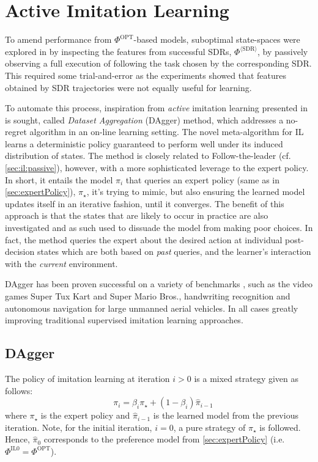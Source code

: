 \documentclass[twocolumn]{svjour3}
\begin{document}
\section{Active Imitation Learning}\label{sec:il:active}

To amend performance from $\Phi^{\text{OPT}}$-based models, suboptimal 
state-spaces were explored in \cite{InRu15a} by inspecting the features from 
successful SDRs, $\Phi^{\langle\text{SDR}\rangle}$, by passively observing a 
full execution of following the task chosen by the corresponding SDR. 
This required some trial-and-error as the experiments showed that features 
obtained by SDR trajectories were not equally useful for learning.

To automate this process, inspiration from \emph{active} imitation learning 
presented in \cite{RossGB11} is sought, called \emph{Dataset Aggregation} 
(DAgger) method, which addresses a no-regret algorithm in an on-line learning 
setting. 
The novel meta-algorithm for IL learns a deterministic policy guaranteed to 
perform well under its induced distribution of states. 
The method is closely related to Follow-the-leader (cf. 
\cref{sec:il:passive}), however, with a more sophisticated leverage to the 
expert policy. 
In short, it entails the model $\pi_i$ that queries an expert policy (same as 
in \cref{sec:expertPolicy}), $\pi_\star$, it's trying to mimic, 
but also ensuring the learned model updates itself in an iterative fashion, 
until it converges. 
The benefit of this approach is that the states that are likely to occur in 
practice are also investigated and as such used to dissuade the model from 
making poor choices. In fact, the method queries the expert about the desired 
action at individual post-decision states which are both based on \emph{past} 
queries, and the learner's interaction with the \emph{current} environment.

DAgger has been proven successful on a variety of benchmarks 
\cite{RossGB11,Ross13}, such as the video games Super Tux Kart and Super 
Mario Bros., handwriting recognition and autonomous navigation for large 
unmanned aerial vehicles. In all cases greatly improving traditional supervised 
imitation learning approaches.

\subsection{DAgger}
The policy of imitation learning at iteration $i>0$ is a mixed strategy given 
as follows:
\begin{equation}\quad\label{eq:il}
\pi_i = \beta_i\pi_\star + (1-\beta_i)\hat{\pi}_{i-1}
\end{equation}
where $\pi_\star$ is the expert policy and $\hat{\pi}_{i-1}$ is the learned 
model from the previous iteration. 
Note, for the initial iteration, $i=0$, a pure strategy of $\pi_\star$ is 
followed. Hence, $\hat{\pi}_0$ corresponds to the preference model from 
\cref{sec:expertPolicy} (i.e. $\Phi^{\text{IL}0}=\Phi^{\text{OPT}}$). 
\end{document}
